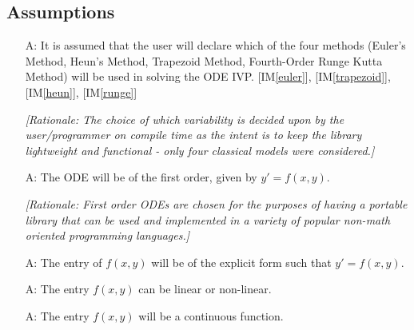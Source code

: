 \documentclass[12pt]{article}
\newcounter{assumpnum} %
\newcommand{\iref}[1]{IM\ref{#1}}
\begin{document}
\subsection{Assumptions}

\begin{itemize}


\item[A\refstepcounter{assumpnum}\theassumpnum \label{A_programcalls}:]
It is assumed that the user will declare which of the four methods (Euler's Method, Heun's
Method, Trapezoid Method, Fourth-Order Runge Kutta Method) will be used in solving
the ODE IVP. [\iref{euler}], [\iref{trapezoid}], [\iref{heun}], [\iref{runge}]

\textit{[Rationale: The choice of which variability is decided upon by the user/programmer
on compile time as the intent is to keep the library lightweight and functional - only four
classical models were considered.]}

\item[A\refstepcounter{assumpnum}\theassumpnum \label{A_typeoff}:]
The ODE will be of the first order, given by $y' = f(x, y)$.

\textit{[Rationale: First order ODEs are chosen for the purposes of having a portable
library that can be used and implemented in a variety of popular non-math oriented programming
languages.]}

\item[A\refstepcounter{assumpnum}\theassumpnum \label{A_explicit}:]
The entry of $f(x, y)$ will be of the explicit form such that $y' = f(x, y)$.

\item[A\refstepcounter{assumpnum}\theassumpnum \label{A_linearity}:]
The entry $f(x, y)$ can be linear or non-linear.

\item[A\refstepcounter{assumpnum}\theassumpnum \label{A_continuous}:]
The entry $f(x, y)$ will be a continuous function.


\end{itemize}
\end{document}
